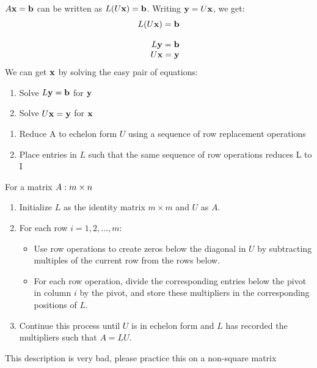 \documentclass{report}
\begin{document}
$A\mathbf{x} = \mathbf{b}$ can be written as $L(U\mathbf{x}) = \mathbf{b}$. Writing $\mathbf{y} = U\mathbf{x}$, we get:
\[
\begin{array}{rlr}
    L(U\mathbf{x}) = \mathbf{b} \\\\
    L\mathbf{y} = \mathbf{b} \\
    U\mathbf{x} = \mathbf{y}
\end{array}
\]
We can get $\mathbf{x}$ by solving the easy pair of equations:
\begin{enumerate}
    \item Solve $L\mathbf{y} = \mathbf{b}$ for $\mathbf{y}$
    \item Solve $U\mathbf{x} = \mathbf{y}$ for $\mathbf{x}$
\end{enumerate}

\begin{tcolorbox}[colback=blue!5!white, colframe=blue!75!black, title=LU Factorization Algorithm (boring)]
\begin{enumerate}
    \item Reduce A to echelon form $U$ using a sequence of row replacement operations
    \item Place entries in $L$ such that the same sequence of row operations reduces L to I
\end{enumerate}
\end{tcolorbox}

\begin{tcolorbox}[colback=blue!5!white, colframe=yellow!75!black, title=LU Factorization Algorithm (fast)]
For a matrix $A: m \times n$
\begin{enumerate}
    \item Initialize $L$ as the identity matrix $m \times m$ and $U$ as $A$.
    \item For each row $i = 1, 2, \dots, m$:
    \begin{itemize}
        \item Use row operations to create zeros below the diagonal in $U$ by subtracting multiples of the current row from the rows below.
        \item For each row operation, divide the corresponding entries below the pivot in column $i$ by the pivot, and store these multipliers in the corresponding positions of $L$.
    \end{itemize}
    \item Continue this process until $U$ is in echelon form and $L$ has recorded the multipliers such that $A = LU$.
\end{enumerate}
\end{tcolorbox}
This description is very bad, please practice this on a non-square matrix 
\end{document}
